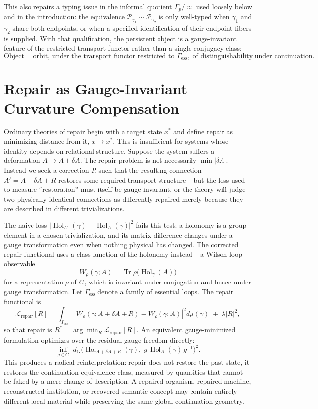\documentclass[11pt]{article}
\newcommand{\Hol}{\operatorname{Hol}}
\newcommand{\Tr}{\operatorname{Tr}}
\begin{document}
This also repairs a typing issue in the informal quotient $\Gamma_p / {\approx}$ used loosely below and in the introduction: the equivalence $\mathcal{P}_{\gamma_1} \sim \mathcal{P}_{\gamma_2}$ is only well-typed when $\gamma_1$ and $\gamma_2$ share both endpoints, or when a specified identification of their endpoint fibers is supplied. With that qualification, the persistent object is a gauge-invariant feature of the restricted transport functor rather than a single conjugacy class:
\[
\text{Object} = \text{orbit, under the transport functor restricted to } \Gamma_{\mathrm{ess}}, \text{ of distinguishability under continuation.}
\]

\section{Repair as Gauge-Invariant Curvature Compensation}

Ordinary theories of repair begin with a target state $x^\ast$ and define repair as minimizing distance from it, $x \rightarrow x^\ast$. This is insufficient for systems whose identity depends on relational structure. Suppose the system suffers a deformation $A \rightarrow A + \delta A$. The repair problem is not necessarily $\min |\delta A|$. Instead we seek a correction $R$ such that the resulting connection $A' = A + \delta A + R$ restores some required transport structure -- but the loss used to measure ``restoration'' must itself be gauge-invariant, or the theory will judge two physically identical connections as differently repaired merely because they are described in different trivializations.

The naive loss $\left| \Hol_{A'}(\gamma) - \Hol_A(\gamma) \right|^2$ fails this test: a holonomy is a group element in a chosen trivialization, and its matrix difference changes under a gauge transformation even when nothing physical has changed. The corrected repair functional uses a class function of the holonomy instead -- a Wilson loop observable
\[
W_\rho(\gamma; A) = \Tr \rho\bigl(\Hol_\gamma(A)\bigr)
\]
for a representation $\rho$ of $G$, which is invariant under conjugation and hence under gauge transformation. Let $\Gamma_{\mathrm{ess}}$ denote a family of essential loops. The repair functional is
\[
\mathcal{L}_{\text{repair}}[R] = \int_{\Gamma_{\mathrm{ess}}} \left| W_\rho(\gamma; A+\delta A + R) - W_\rho(\gamma; A) \right|^2 d\mu(\gamma) \;+\; \lambda |R|^2,
\]
so that repair is $R^\ast = \arg\min_R \mathcal{L}_{\text{repair}}[R]$. An equivalent gauge-minimized formulation optimizes over the residual gauge freedom directly:
\[
\inf_{g \in G} \; d_G\bigl( \Hol_{A+\delta A + R}(\gamma),\; g\, \Hol_A(\gamma)\, g^{-1} \bigr)^2.
\]
This produces a radical reinterpretation: repair does not restore the past state, it restores the continuation equivalence class, measured by quantities that cannot be faked by a mere change of description. A repaired organism, repaired machine, reconstructed institution, or recovered semantic concept may contain entirely different local material while preserving the same global continuation geometry.
\end{document}
